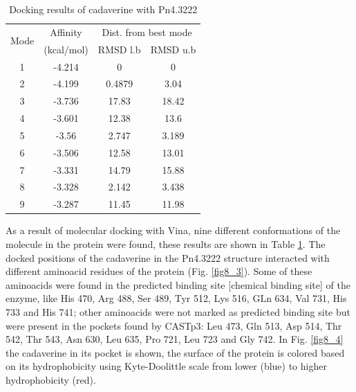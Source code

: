 \documentclass[12pt]{article}
\begin{document}
	
	\begin{table}
		\centering
		\caption{\centering Docking results of cadaverine with Pn4.3222}
		\label{table8}
		\begin{tabular}{cccc}
			\toprule
			\multirow{2}{*}{Mode} & Affinity & \multicolumn{2}{c}{Dist. from best mode}\\
			&  (kcal/mol) & RMSD l.b & RMSD u.b\\
			\midrule
			1 & -4.214   &       0   &       0\\
			2 & -4.199   &  0.4879   &    3.04\\
			3 & -3.736   &   17.83   &   18.42\\
			4 & -3.601   &   12.38   &    13.6\\
			5 &  -3.56   &   2.747   &   3.189\\
			6 & -3.506   &   12.58   &   13.01\\
			7 & -3.331   &   14.79   &   15.88\\
			8 & -3.328   &   2.142   &   3.438\\
			9 & -3.287   &   11.45   &   11.98\\
			\bottomrule
			
		\end{tabular}
	\end{table}
	
	As a result of molecular docking with Vina, nine different conformations of the molecule in the protein were found, these results are shown in Table \ref{table8}. The docked positions of the cadaverine in the Pn4.3222 structure interacted with different aminoacid residues of the protein (Fig. \ref{fig8_3}). Some of these aminoacids were found in the predicted binding site [chemical binding site] of the enzyme, like His 470, Arg 488, Ser 489, Tyr 512, Lys 516, GLn 634, Val 731, His 733 and His 741; other aminoacids were not marked as predicted binding site but were present in the pockets found by CASTp3: Leu 473, Gln 513, Asp 514, Thr 542, Thr 543, Asn 630, Leu 635, Pro 721, Leu 723 and Gly 742. In Fig. \ref{fig8_4} the cadaverine in its pocket is shown, the surface of the protein is colored based on its hydrophobicity using Kyte-Doolittle scale from lower (blue) to higher hydrophobicity (red).
	
	\newpage
	
\end{document}

